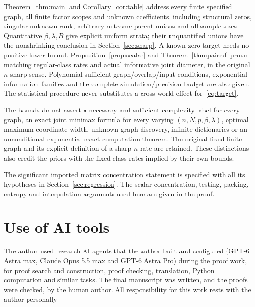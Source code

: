 \documentclass[11pt,a4paper]{article}
\numberwithin{equation}{section}
\theoremstyle{definition}
\begin{document}
Theorem~\ref{thm:main} and Corollary~\ref{cor:table} address every finite
specified graph, all finite factor scopes and unknown coefficients,
including structural zeros, singular unknown rank, arbitrary outcome
parent unions and all sample sizes. Quantitative $\beta,\lambda,B$
give explicit uniform strata; their unquantified unions have the
nonshrinking conclusion in Section~\ref{sec:sharp}. A known zero target
needs no positive lower bound. Proposition~\ref{prop:scalar} and
Theorem~\ref{thm:paired} prove matching regular-class rates and actual
informative joint diameter, in the original $n$-sharp sense. Polynomial
sufficient graph/overlap/input conditions, exponential information
families and the complete simulation/precision budget are also given. The statistical procedure never substitutes a
cross-world effect for~\eqref{eq:target}.

The bounds do not assert a necessary-and-sufficient complexity label for
every graph, an exact joint minimax formula for every varying
$(n,N,p,\beta,\lambda)$, optimal maximum coordinate width, unknown graph
discovery, infinite dictionaries or an unconditional exponential exact
computation theorem. The original fixed finite graph and its explicit
definition of a sharp $n$-rate are retained. These distinctions also
credit the priors with the fixed-class rates implied by their own
bounds.

The significant imported matrix concentration statement is specified
with all its hypotheses in Section~\ref{sec:regression}. The scalar
concentration, testing, packing, entropy and interpolation arguments
used here are given in the proof.

\section*{Use of AI tools}
The author used research AI agents that the author built and configured (GPT-6 Astra max,
Claude Opus 5.5 max and GPT-6 Astra Pro) during the proof work, for proof search and
construction, proof checking, translation, Python computation and similar tasks. The final
manuscript was written, and the proofs were checked, by the human author. All responsibility
for this work rests with the author personally.
\end{document}
